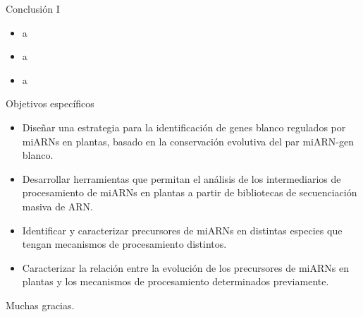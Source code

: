\documentclass{beamer}
\begin{document}
\begin{frame}{Conclusión I}
	\begin{itemize}
        \item<1-> a
        \item<2-> a
        \item<3-> a
	\end{itemize}
\end{frame}



\begin{frame}{Objetivos específicos}
		\pause
		\begin{itemize}
            \item<-1> Diseñar una estrategia para la identificación de genes blanco regulados por miARNs en plantas, basado en la conservación evolutiva del par miARN-gen blanco.
			\item<-2> Desarrollar herramientas que permitan el análisis de los intermediarios de procesamiento de miARNs en plantas a partir de bibliotecas de secuenciación masiva de ARN.
			\item<-1> Identificar y caracterizar precursores de miARNs en distintas especies que tengan mecanismos de procesamiento distintos.
			\item<-1> Caracterizar la relación entre la evolución de los precursores de miARNs en plantas y los mecanismos de procesamiento determinados previamente.
        \end{itemize}
\end{frame}



\begin{frame}{}
	\begin{center}
		\Huge Muchas gracias.
	\end{center}
\end{frame}
\end{document}
